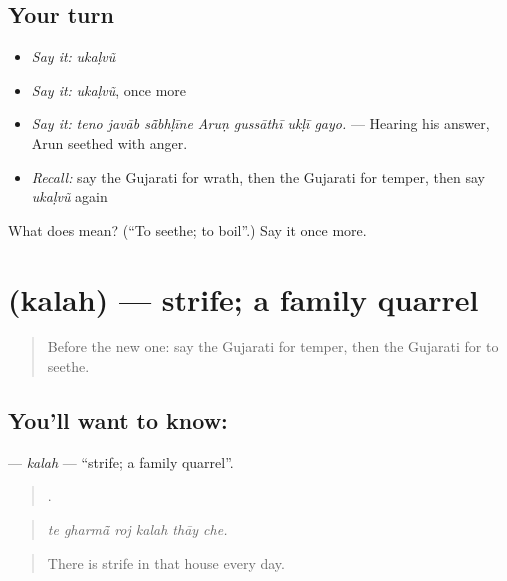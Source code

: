 \subsection*{Your turn}
\begin{itemize}
\raggedright
  \item \emph{Say it:} \emph{ukaḷvũ}
  \item \emph{Say it:} \emph{ukaḷvũ}, once more
  \item \emph{Say it:} \emph{teno javāb sā̃bhḷīne Aruṇ gussāthī ukḷī gayo.} — Hearing his answer, Arun seethed with anger.
  \item \emph{Recall:} say the Gujarati for wrath, then the Gujarati for temper, then say \emph{ukaḷvũ} again
\end{itemize}

\begin{tcolorbox}[breakable,colback=teal!4,colframe=teal!35!black,title={Before you move on}]
What does  mean? (\textquotedblleft{}To seethe; to boil\textquotedblright{}.) Say it once more.
\end{tcolorbox}
\section[\texorpdfstring{\gu{કલહ} (kalah)}{કલહ (kalah)}]{ (kalah) — strife; a family quarrel}

\label{lesson:GU-C452-kalah}



\begin{quote}
Before the new one: say the Gujarati for temper, then the Gujarati for to seethe.
\end{quote}

\subsection*{You'll want to know: }
\textbf{} — \emph{kalah} — \textquotedblleft{}strife; a family quarrel\textquotedblright{}.

\begin{quote}
     .
\end{quote}

\begin{quote}
\emph{te gharmā̃ roj kalah thāy che.}
\end{quote}

\begin{quote}
There is strife in that house every day.
\end{quote}

